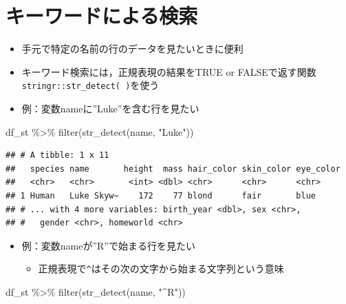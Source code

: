 \documentclass[
  xelatex,ja=standard, b5paper]{bxjsbook}
\newenvironment{Shaded}{\begin{snugshade}}{\end{snugshade}}
\newcommand{\FunctionTok}[1]{\textcolor[rgb]{0.00,0.00,0.00}{#1}}
\newcommand{\NormalTok}[1]{#1}
\newcommand{\SpecialCharTok}[1]{\textcolor[rgb]{0.00,0.00,0.00}{#1}}
\newcommand{\StringTok}[1]{\textcolor[rgb]{0.31,0.60,0.02}{#1}}
\providecommand{\tightlist}{%
  \setlength{\itemsep}{0pt}\setlength{\parskip}{0pt}}
\begin{document}
\hypertarget{filter-kw}{%
\section{キーワードによる検索}\label{filter-kw}}

\begin{itemize}
\item
  手元で特定の名前の行のデータを見たいときに便利
\item
  キーワード検索には，正規表現の結果をTRUE or FALSEで返す関数\texttt{stringr::str\_detect(\ )}を使う
\item
  例：変数nameに''Luke''を含む行を見たい
\end{itemize}

\begin{Shaded}
\begin{Highlighting}[]
\NormalTok{df\_st }\SpecialCharTok{\%\textgreater{}\%}
  \FunctionTok{filter}\NormalTok{(}\FunctionTok{str\_detect}\NormalTok{(name, }\StringTok{"Luke"}\NormalTok{))}
\end{Highlighting}
\end{Shaded}

\begin{verbatim}
## # A tibble: 1 x 11
##   species name       height  mass hair_color skin_color eye_color
##   <chr>   <chr>       <int> <dbl> <chr>      <chr>      <chr>    
## 1 Human   Luke Skyw~    172    77 blond      fair       blue     
## # ... with 4 more variables: birth_year <dbl>, sex <chr>,
## #   gender <chr>, homeworld <chr>
\end{verbatim}

\begin{itemize}
\tightlist
\item
  例：変数nameが''R''で始まる行を見たい

  \begin{itemize}
  \tightlist
  \item
    正規表現で\texttt{\^{}}はその次の文字から始まる文字列という意味
  \end{itemize}
\end{itemize}

\begin{Shaded}
\begin{Highlighting}[]
\NormalTok{df\_st }\SpecialCharTok{\%\textgreater{}\%}
  \FunctionTok{filter}\NormalTok{(}\FunctionTok{str\_detect}\NormalTok{(name, }\StringTok{"\^{}R"}\NormalTok{))}
\end{Highlighting}
\end{Shaded}
\end{document}
